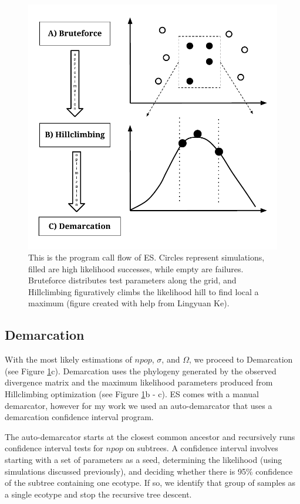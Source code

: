 \begin{figure}[h!]
 \centering
 \includegraphics[scale=0.75]{images/ESFlow-CH2.pdf}
 \caption[Ecotype Simulation program flow diagram.]{This is the program call flow of ES. Circles represent simulations, filled are high likelihood successes, while empty are failures. Bruteforce distributes test parameters along the grid, and Hillclimbing figuratively climbs the likelihood hill to find local a maximum (figure created with help from Lingyuan Ke). }
 \label{fig:Flow}
\end{figure}

\subsection*{Demarcation}
With the most likely estimations of $npop$, $\sigma$, and $\Omega$, we proceed to Demarcation (see Figure \ref{fig:Flow}c).
Demarcation uses the phylogeny generated by the observed divergence matrix and the maximum likelihood parameters produced from Hillclimbing optimization (see Figure \ref{fig:Flow}b - c).
ES comes with a manual demarcator, however for my work we used an auto-demarcator that uses a demarcation confidence interval program.

The auto-demarcator starts at the closest common ancestor and recursively runs confidence interval tests for $npop$ on subtrees.
A confidence interval involves starting with a set of parameters as a seed, determining the likelihood (using simulations discussed previously), and deciding whether there is 95\% confidence of the subtree containing one ecotype.
If so, we identify that group of samples as a single ecotype and stop the recursive tree descent.

